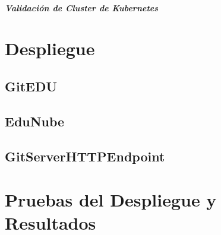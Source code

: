 


\subparagraph{Validación de Cluster de Kubernetes}
  

\section{Despliegue}
% 

\subsection{GitEDU}

\subsection{EduNube}

\subsection{GitServerHTTPEndpoint}

\section{Pruebas del Despliegue y Resultados}

